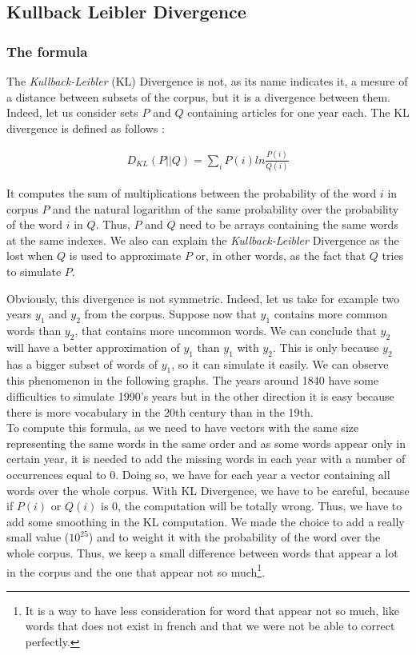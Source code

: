 \subsection{Kullback Leibler Divergence}

\subsubsection{The formula}
The \emph{Kullback-Leibler} (KL) Divergence is not, as its name indicates it, a mesure of a distance between subsets of the corpus, but it is a divergence between them. Indeed, let us consider sets $P$ and $Q$ containing articles for one year each. The KL divergence is defined as follows :

\begin{eqnarray}\label{KL}
    D_{KL}(P||Q) = \sum_i P(i) ln \frac{P(i)}{Q(i)}
\end{eqnarray}

It computes the sum of multiplications between the probability of the word $i$ in corpus $P$ and the natural logarithm of the same probability over the probability of the word $i$ in $Q$. Thus, $P$ and $Q$ need to be arrays containing the same words at the same indexes. We also can explain the \emph{Kullback-Leibler} Divergence as the lost when $Q$ is used to approximate $P$ or, in other words, as the fact that $Q$ tries to simulate $P$.

Obviously, this divergence is not symmetric. Indeed, let us take for example two years $y_1$ and $y_2$ from the corpus. Suppose now that $y_1$ contains more common words than $y_2$, that contains more uncommon words. We can conclude that $y_2$ will have a better approximation of $y_1$ than $y_1$ with $y_2$. This is only because $y_2$ has a bigger subset of words of $y_1$, so it can simulate it easily. We can observe this phenomenon in the following graphs. The years around 1840 have some difficulties to simulate 1990's years but in the other direction it is easy because there is more vocabulary in the 20th century than in the 19th.\\

To compute this formula, as we need to have vectors with the same size representing the same words in the same order and as some words appear only in certain year, it is needed to add the missing words in each year with a number of occurrences equal to 0. Doing so, we have for each year a vector containing all words over the whole corpus. With KL Divergence, we have to be careful, because if $P(i)$ or $Q(i)$ is 0, the computation will be totally wrong. Thus, we have to add some smoothing in the KL computation. We made the choice to add a really small value ($10^{25}$) and to weight it with the probability of the word over the whole corpus. Thus, we keep a small difference between words that appear a lot in the corpus and the one that appear not so much\footnote{It is a way to have less consideration for word that appear not so much, like words that does not exist in french and that we were not be able to correct perfectly.}.

